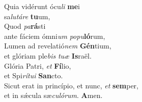 \evenverse Quia vidérunt ócu\textit{li} \textbf{me}i~\*\\
\evenverse sa\textit{lu}\textit{tá}\textit{re} \textbf{tu}um,\\
\oddverse Quod \textit{pa}\textbf{rá}sti~\*\\
\oddverse ante fáciem ómni\textit{um} \textit{po}\textit{pu}\textbf{ló}rum,\\
\evenverse Lumen ad revelatió\textit{nem} \textbf{Gén}tium,~\*\\
\evenverse et glóriam ple\textit{bis} \textit{tu}\textit{æ} \textbf{Is}raël.\\
\oddverse Glória Patri, \textit{et} \textbf{Fí}lio,~\*\\
\oddverse et Spi\textit{rí}\textit{tu}\textit{i} \textbf{San}cto.\\
\evenverse Sicut erat in princípio, et nunc, \textit{et} \textbf{sem}per,~\*\\
\evenverse et in sǽcula sæ\textit{cu}\textit{ló}\textit{rum}. \textbf{A}men.\\
